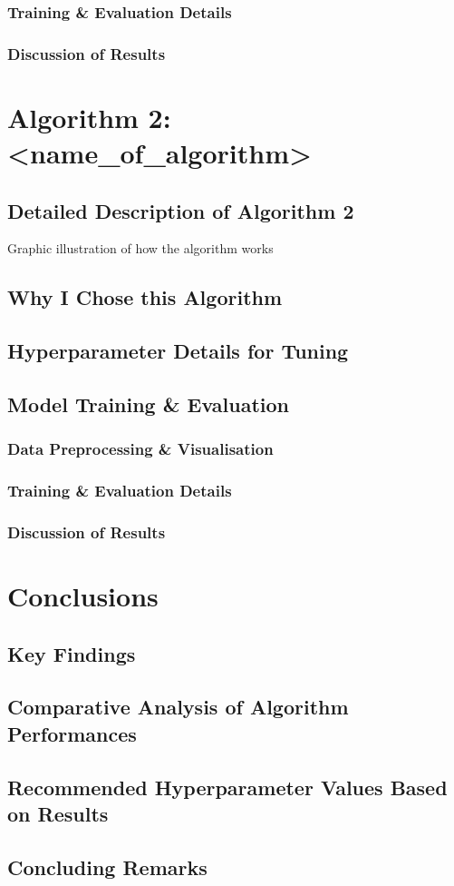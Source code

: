 \documentclass[a4paper]{article}
\begin{document}
\subsubsection{Training \& Evaluation Details}
\subsubsection{Discussion of Results}

\section{Algorithm 2: <name\_of\_algorithm>}

\subsection{Detailed Description of Algorithm 2}
Graphic illustration of how the algorithm works

\subsection{Why I Chose this Algorithm}

\subsection{Hyperparameter Details for Tuning}

\subsection{Model Training \& Evaluation}
\subsubsection{Data Preprocessing \& Visualisation}
\subsubsection{Training \& Evaluation Details}
\subsubsection{Discussion of Results}

\section{Conclusions}
\subsection{Key Findings}
\subsection{Comparative Analysis of Algorithm Performances}
\subsection{Recommended Hyperparameter Values Based on Results}
\subsection{Concluding Remarks}



\end{document}
